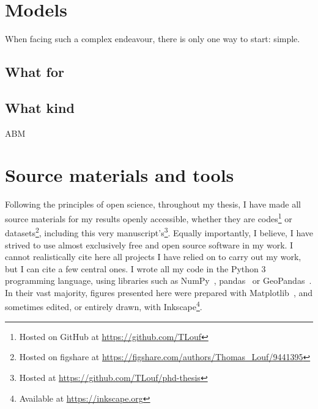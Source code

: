 \documentclass[../thesis.tex]{subfiles}
\begin{document}

\section{Models}

When facing such a complex endeavour, there is only one way to start: simple.

\subsection{What for}



\subsection{What kind}



\ac{ABM}


\section{Source materials and tools}
Following the principles of open science, throughout my thesis, I have made all source
materials for my results openly accessible, whether they are codes\footnote{Hosted on
GitHub at \url{https://github.com/TLouf}} or datasets\footnote{Hosted on figshare at
\url{https://figshare.com/authors/Thomas_Louf/9441395}}, including this very
manuscript's\footnote{Hosted at \url{https://github.com/TLouf/phd-thesis}}. Equally importantly, I believe, I have strived to use almost exclusively free
and open source software in my work. I cannot realistically cite here all projects I
have relied on to carry out my work, but I can cite a few central ones. I wrote all my
code in the Python 3 programming language, using libraries such as
NumPy~\cite{HarrisArrayProgramming2020},
pandas~\cite{teamPandasdevPandas2020} or
GeoPandas~\cite{JordahlGeopandasGeopandas2020}. In their vast majority, figures
presented here were prepared with Matplotlib~\cite{HunterMatplotlib2D2007}, and
sometimes edited, or entirely drawn, with Inkscape\footnote{Available at
\url{https://inkscape.org}}.
\end{document}
